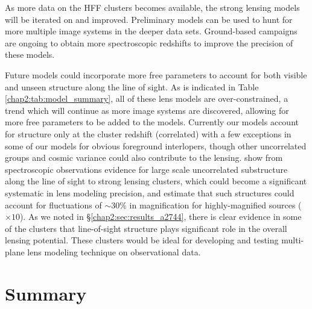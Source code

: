 As more data on the HFF clusters becomes available, the strong lensing models will be iterated on and improved. Preliminary models can be used to hunt for more multiple image systems in the deeper data sets. Ground-based campaigns are ongoing to obtain more spectroscopic redshifts to improve the precision of these models.

Future models could incorporate more free parameters to account for both visible and unseen structure along the line of sight. As is indicated in Table \ref{chap2:tab:model_summary}, all of these lens models are over-constrained, a trend which will continue as more image systems are discovered, allowing for more free parameters to be added to the models. Currently our models account for structure only at the cluster redshift (correlated) with a few exceptions in some of our models for obvious foreground interlopers, though other uncorrelated groups and cosmic variance could also contribute to the lensing. \citet{Bayliss:2014fk} show from spectroscopic observations evidence for large scale uncorrelated substructure along the line of sight to strong lensing clusters, which could become a significant systematic in lens modeling precision, and \citet{DAloisio:2013ul} estimate that such structures could account for fluctuations of $\sim30\%$ in magnification for highly-magnified sources ($\times10$). As we noted in \S \ref{chap2:sec:results_a2744}, there is clear evidence in some of the clusters that line-of-sight structure plays significant role in the overall lensing potential. These clusters would be ideal for developing and testing multi-plane lens modeling technique on observational data. 

\section{Summary}
\label{chap2:sec:conclusion}

